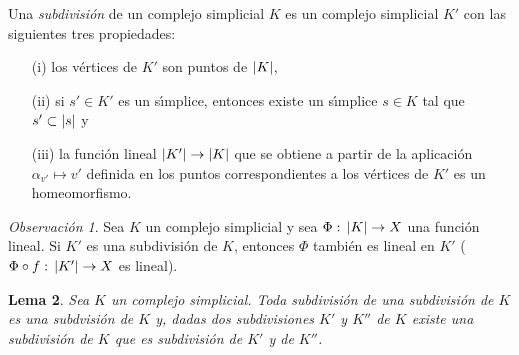 \theoremstyle{plain}
\newtheorem{lemaConjuntoDirigidoSubdivisiones}{Lema}[section]
\newtheorem{lemaSubdivisionEquivaleAParticion}%
	[lemaConjuntoDirigidoSubdivisiones]{Lema}

\theoremstyle{remark}
\newtheorem{obsDefinicionSubdivisiones}[lemaConjuntoDirigidoSubdivisiones]%
	{Observaci\'{o}n}
\newtheorem{obsSubdividirUnSubcomplejo}[lemaConjuntoDirigidoSubdivisiones]%
	{Observaci\'{o}n}
\newtheorem{obsSubdividirUnParSimplicial}[lemaConjuntoDirigidoSubdivisiones]%
	{Observaci\'{o}n}
\newtheorem{obsTriangularPorSubdivisiones}[lemaConjuntoDirigidoSubdivisiones]%
	{Observaci\'{o}n}
\newtheorem{obsLinealEnLaSubdivision}[lemaConjuntoDirigidoSubdivisiones]%
	{Observaci\'{o}n}
\newtheorem{obsSubdivisionesYEstrellas}[lemaConjuntoDirigidoSubdivisiones]%
	{Observaci\'{o}n}


Una \emph{subdivisi\'{o}n} de un complejo simplicial $K$ es un complejo
simplicial $K'$ con las siguientes tres propiedades:
\begin{itemize}
	\item[(i)] los v\'{e}rtices de $K'$ son puntos de $\left|K\right|$,
	\item[(ii)] si $s'\in K'$ es un s\'{\i}mplice, entonces existe un
		s\'{\i}mplice $s\in K$ tal que $s'\subset\left|s\right|$ y
	\item[(iii)] la funci\'{o}n lineal $\left|K'\right|\rightarrow\left|K\right|$
		que se obtiene a partir de la aplicaci\'{o}n
		$\alpha_{v'}\mapsto v'$	definida en los puntos
		correspondientes a los v\'{e}rtices de $K'$ es un
		homeomorfismo.
\end{itemize}
%
\begin{obsLinealEnLaSubdivision}\label{obs:linealenlasubdivision}
	Sea $K$ un complejo simplicial y sea $\Phi:\,\left|K\right|\rightarrow X$
	una funci\'{o}n lineal. Si $K'$ es una subdivisi\'{o}n de $K$,
	entonces $\Phi$ tambi\'{e}n es lineal en $K'$
	($\Phi\circ f:\,\left|K'\right|\rightarrow X$ es lineal).
\end{obsLinealEnLaSubdivision}

\begin{lemaConjuntoDirigidoSubdivisiones}%
	\label{thm:conjuntodirigidosubdivisiones}
	Sea $K$ un complejo simplicial. Toda subdivisi\'{o}n de una
	subdivisi\'{o}n de $K$ es una subdvisi\'{o}n de $K$ y, dadas dos
	subdivisiones $K'$ y $K''$ de $K$ existe una subdivisi\'{o}n de $K$
	que es subdivisi\'{o}n de $K'$ y de $K''$.
\end{lemaConjuntoDirigidoSubdivisiones}

